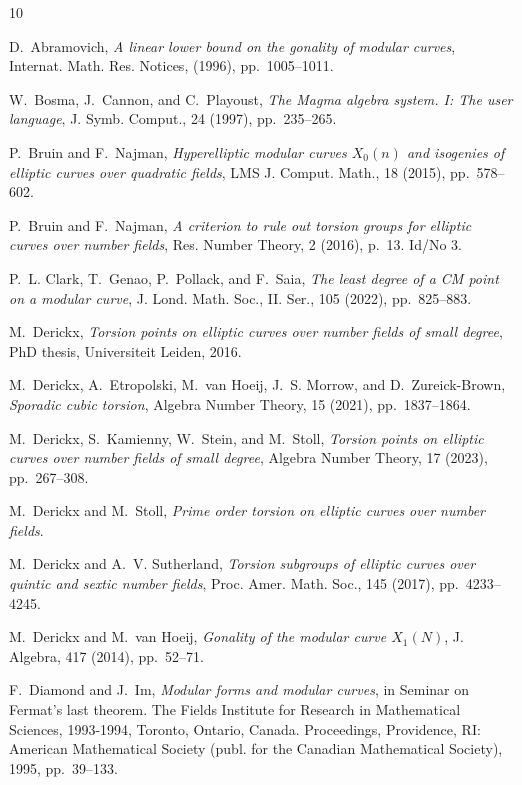 \documentclass[11pt,reqno]{amsart}
\theoremstyle{definition}
\numberwithin{equation}{section}
\begin{document}
\def\cprime{$'$} \def\cprime{$'$}
\begin{thebibliography}{10}

{\sc D.~Abramovich}, {\em A linear lower bound on the gonality of modular curves}, Internat. Math. Res. Notices,  (1996), pp.~1005--1011.

{\sc W.~Bosma, J.~Cannon, and C.~Playoust}, {\em The {Magma} algebra system. {I}: {The} user language}, J. Symb. Comput., 24 (1997), pp.~235--265.

{\sc P.~Bruin and F.~Najman}, {\em Hyperelliptic modular curves {$X_0(n)$} and isogenies of elliptic curves over quadratic fields}, LMS J. Comput. Math., 18 (2015), pp.~578--602.

{\sc P.~{Bruin} and F.~{Najman}}, {\em {A criterion to rule out torsion groups for elliptic curves over number fields}}, {Res. Number Theory}, 2 (2016), p.~13.
\newblock Id/No 3.

{\sc P.~L. Clark, T.~Genao, P.~Pollack, and F.~Saia}, {\em The least degree of a {CM} point on a modular curve}, J. Lond. Math. Soc., II. Ser., 105 (2022), pp.~825--883.

{\sc M.~Derickx}, {\em Torsion points on elliptic curves over number fields of small degree}, PhD thesis, Universiteit Leiden, 2016.

{\sc M.~{Derickx}, A.~{Etropolski}, M.~{van Hoeij}, J.~S. {Morrow}, and D.~{Zureick-Brown}}, {\em {Sporadic cubic torsion}}, {Algebra Number Theory}, 15 (2021), pp.~1837--1864.

{\sc M.~Derickx, S.~Kamienny, W.~Stein, and M.~Stoll}, {\em Torsion points on elliptic curves over number fields of small degree}, Algebra Number Theory, 17 (2023), pp.~267--308.

{\sc M.~Derickx and M.~Stoll}, {\em Prime order torsion on elliptic curves over number fields}.

{\sc M.~Derickx and A.~V. Sutherland}, {\em Torsion subgroups of elliptic curves over quintic and sextic number fields}, Proc. Amer. Math. Soc., 145 (2017), pp.~4233--4245.

{\sc M.~Derickx and M.~van Hoeij}, {\em Gonality of the modular curve {$X_1(N)$}}, J. Algebra, 417 (2014), pp.~52--71.

{\sc F.~Diamond and J.~Im}, {\em Modular forms and modular curves}, in Seminar on Fermat's last theorem. The Fields Institute for Research in Mathematical Sciences, 1993-1994, Toronto, Ontario, Canada. Proceedings, Providence, RI: American Mathematical Society (publ. for the Canadian Mathematical Society), 1995, pp.~39--133.


\end{thebibliography}
\end{document}
